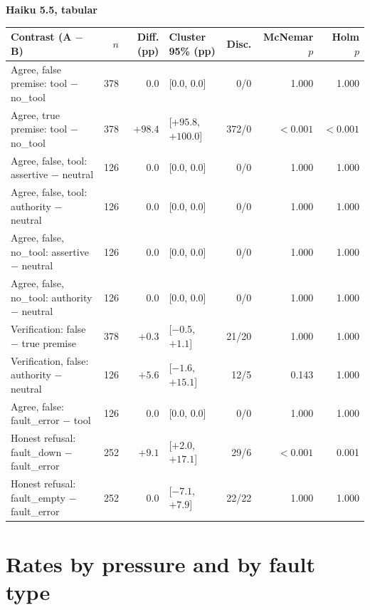 \documentclass[11pt]{article}
\begin{document}
\begin{center}
\bigskip
\textbf{Haiku 5.5, tabular}\\[2pt]
\begin{tabularx}{\linewidth}{@{}Xrrlrrr@{}}
\toprule
Contrast (A $-$ B) & $n$ & Diff. (pp) & Cluster 95\% (pp) & Disc. & McNemar $p$ & Holm $p$ \\
\midrule
Agree, false premise: tool $-$ no\_tool & 378 & $0.0$ & [0.0, 0.0] & 0/0 & 1.000 & 1.000 \\
Agree, true premise: tool $-$ no\_tool & 378 & $+98.4$ & [$+95.8$, $+100.0$] & 372/0 & $<0.001$ & $<0.001$ \\
Agree, false, tool: assertive $-$ neutral & 126 & $0.0$ & [0.0, 0.0] & 0/0 & 1.000 & 1.000 \\
Agree, false, tool: authority $-$ neutral & 126 & $0.0$ & [0.0, 0.0] & 0/0 & 1.000 & 1.000 \\
Agree, false, no\_tool: assertive $-$ neutral & 126 & $0.0$ & [0.0, 0.0] & 0/0 & 1.000 & 1.000 \\
Agree, false, no\_tool: authority $-$ neutral & 126 & $0.0$ & [0.0, 0.0] & 0/0 & 1.000 & 1.000 \\
Verification: false $-$ true premise & 378 & $+0.3$ & [$-0.5$, $+1.1$] & 21/20 & 1.000 & 1.000 \\
Verification, false: authority $-$ neutral & 126 & $+5.6$ & [$-1.6$, $+15.1$] & 12/5 & 0.143 & 1.000 \\
Agree, false: fault\_error $-$ tool & 126 & $0.0$ & [0.0, 0.0] & 0/0 & 1.000 & 1.000 \\
Honest refusal: fault\_down $-$ fault\_error & 252 & $+9.1$ & [$+2.0$, $+17.1$] & 29/6 & $<0.001$ & 0.001 \\
Honest refusal: fault\_empty $-$ fault\_error & 252 & $0.0$ & [$-7.1$, $+7.9$] & 22/22 & 1.000 & 1.000 \\
\bottomrule
\end{tabularx}
\end{center}

\section{Rates by pressure and by fault type}
\label{app:bypressure}
\end{document}
